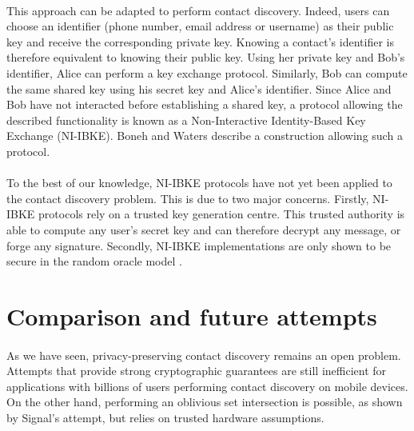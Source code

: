 \paragraph{} This approach can be adapted to perform contact discovery. Indeed, users can choose an identifier (phone number, email address or username) as their public key and receive the corresponding private key. Knowing a contact's identifier is therefore equivalent to knowing their public key. Using her private key and Bob's identifier, Alice can perform a key exchange protocol. Similarly, Bob can compute the same shared key using his secret key and Alice's identifier. Since Alice and Bob have not interacted before establishing a shared key, a protocol allowing the described functionality is known as a Non-Interactive Identity-Based Key Exchange (NI-IBKE). Boneh and Waters \cite{LRPRF} describe a construction allowing such a protocol.

\paragraph{} To the best of our knowledge, NI-IBKE protocols have not yet been applied to the contact discovery problem. This is due to two major concerns. Firstly, NI-IBKE protocols rely on a trusted key generation centre. This trusted authority is able to compute any user's secret key and can therefore decrypt any message, or forge any signature. Secondly, NI-IBKE implementations are only shown to be secure in the random oracle model \cite{Freire2014,Tomida2019}.

\section{Comparison and future attempts}
\label{sec:litcomp}

\paragraph{} As we have seen, privacy-preserving contact discovery remains an open problem. Attempts that provide strong cryptographic guarantees are still inefficient for applications with billions of users performing contact discovery on mobile devices. On the other hand, performing an oblivious set intersection is possible, as shown by Signal's attempt, but relies on trusted hardware assumptions.

